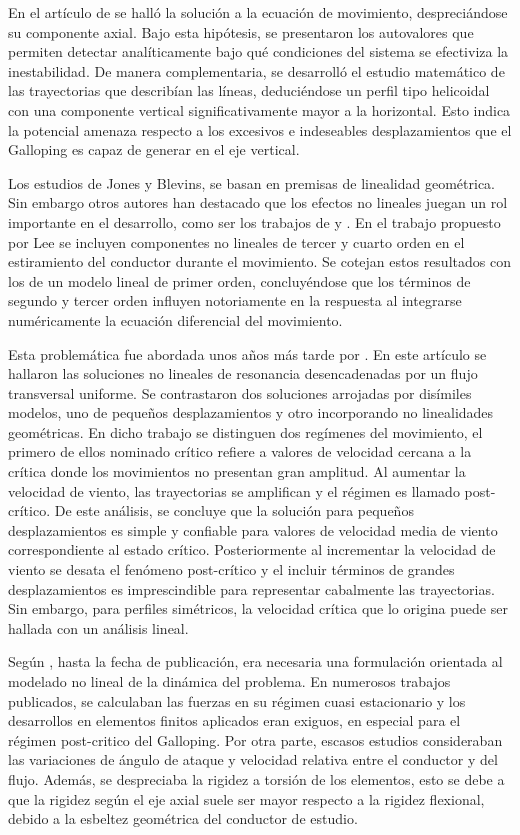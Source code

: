 En el artículo de \cite{jones1992coupled} se halló la solución a la ecuación de movimiento, despreciándose su componente axial. Bajo esta hipótesis, se presentaron los autovalores que permiten detectar analíticamente bajo qué condiciones del sistema se efectiviza la inestabilidad. De manera complementaria, se desarrolló el estudio matemático de las trayectorias que describían las líneas, deduciéndose un perfil tipo helicoidal con una componente vertical significativamente mayor a la horizontal. Esto indica la potencial amenaza respecto a los excesivos e indeseables desplazamientos que el Galloping es capaz de generar en el eje vertical. 

Los estudios de Jones y Blevins, se basan en premisas de linealidad geométrica. Sin embargo otros autores han destacado que los efectos no lineales juegan un rol importante en el desarrollo, como ser los trabajos de \cite{luongo1984planar} y \cite{lee1992nonlinear}. En el trabajo propuesto por Lee se incluyen componentes no lineales de tercer y cuarto orden en el estiramiento del conductor durante el movimiento. Se cotejan estos resultados con los de un modelo lineal de primer orden, concluyéndose que los términos de segundo y tercer orden influyen notoriamente en la respuesta al integrarse numéricamente la ecuación diferencial del movimiento. 

Esta problemática fue abordada unos años más tarde por  \cite{luongo1998non}. En este artículo se hallaron las soluciones no lineales de resonancia desencadenadas por un flujo transversal uniforme. 
Se contrastaron dos soluciones arrojadas por disímiles modelos, uno de pequeños desplazamientos y otro incorporando no linealidades geométricas. En dicho trabajo se distinguen dos regímenes del movimiento, el primero de ellos nominado crítico refiere a valores de velocidad cercana a la crítica donde los movimientos no presentan gran amplitud. Al aumentar la velocidad de viento, las trayectorias se amplifican y el régimen es llamado post-crítico. De este análisis, se concluye que la solución para pequeños desplazamientos es simple y confiable para valores de velocidad media de viento correspondiente al estado crítico. Posteriormente al incrementar la velocidad de viento se desata el fenómeno post-crítico y el incluir términos de grandes desplazamientos es imprescindible para representar cabalmente las trayectorias. Sin embargo, para perfiles simétricos, la velocidad crítica que lo origina puede ser hallada con un análisis lineal.

Según \cite{luongo2007linear}, hasta la fecha de publicación, era necesaria una formulación orientada al modelado no lineal de la dinámica del problema. En numerosos trabajos publicados, se calculaban las fuerzas en su régimen cuasi estacionario y los desarrollos en elementos finitos aplicados eran exiguos, en especial para el régimen post-critico del Galloping. Por otra parte, escasos estudios consideraban las variaciones de ángulo de ataque y velocidad relativa entre el conductor y del flujo. Además, se despreciaba la rigidez a torsión de los elementos, esto se debe a que la rigidez según el eje axial suele ser mayor respecto a la rigidez flexional, debido a la esbeltez geométrica del conductor de estudio.  


